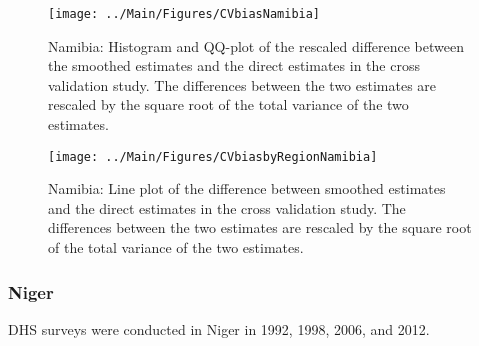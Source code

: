 \documentclass[12pt]{article}\usepackage[]{graphicx}\usepackage[]{color}
\newenvironment{knitrout}{}{} %
\begin{document}
\begin{knitrout}
\color{fgcolor}\begin{figure}[bht]

{\centering \texttt{[image: ../Main/Figures/CVbiasNamibia]} 

}

\caption[Namibia]{Namibia: Histogram and QQ-plot of the rescaled difference between the smoothed estimates and the direct estimates in the cross validation study. The differences between the two estimates are rescaled by the square root of the total variance of the two estimates.}\label{fig:unnamed-chunk-249}
\end{figure}


\end{knitrout}

\begin{knitrout}
\color{fgcolor}\begin{figure}[bht]

{\centering \texttt{[image: ../Main/Figures/CVbiasbyRegionNamibia]} 

}

\caption[Namibia]{Namibia: Line plot of the difference between smoothed estimates and the direct estimates in the cross validation study. The differences between the two estimates are rescaled by the square root of the total variance of the two estimates.}\label{fig:unnamed-chunk-250}
\end{figure}


\end{knitrout}


\clearpage
\subsubsection{Niger}





DHS surveys were conducted in Niger in 1992, 1998, 2006, and 2012.
\end{document}
